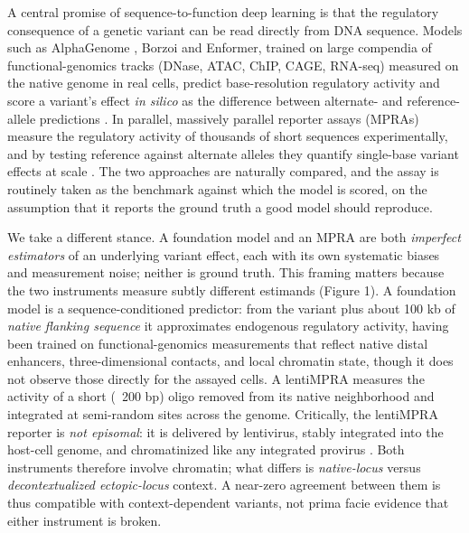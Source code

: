 \documentclass[9pt,twocolumn]{article}
\begin{document}
A central promise of sequence-to-function deep learning is that the regulatory consequence of a genetic variant can be read directly from DNA sequence. Models such as AlphaGenome \cite{r11}, Borzoi and Enformer, trained on large compendia of functional-genomics tracks (DNase, ATAC, ChIP, CAGE, RNA-seq) measured on the native genome in real cells, predict base-resolution regulatory activity and score a variant's effect \textit{in silico} as the difference between alternate- and reference-allele predictions \cite{r2,r3,r4}. In parallel, massively parallel reporter assays (MPRAs) measure the regulatory activity of thousands of short sequences experimentally, and by testing reference against alternate alleles they quantify single-base variant effects at scale \cite{r1,r5}. The two approaches are naturally compared, and the assay is routinely taken as the benchmark against which the model is scored, on the assumption that it reports the ground truth a good model should reproduce.

We take a different stance. A foundation model and an MPRA are both \textit{imperfect estimators} of an underlying variant effect, each with its own systematic biases and measurement noise; neither is ground truth. This framing matters because the two instruments measure subtly different estimands (Figure 1). A foundation model is a sequence-conditioned predictor: from the variant plus about 100 kb of \textit{native flanking sequence} it approximates endogenous regulatory activity, having been trained on functional-genomics measurements that reflect native distal enhancers, three-dimensional contacts, and local chromatin state, though it does not observe those directly for the assayed cells. A lentiMPRA measures the activity of a short (~200 bp) oligo removed from its native neighborhood and integrated at semi-random sites across the genome. Critically, the lentiMPRA reporter is \textit{not episomal}: it is delivered by lentivirus, stably integrated into the host-cell genome, and chromatinized like any integrated provirus \cite{r1}. Both instruments therefore involve chromatin; what differs is \textit{native-locus} versus \textit{decontextualized ectopic-locus} context. A near-zero agreement between them is thus compatible with context-dependent variants, not prima facie evidence that either instrument is broken.
\end{document}
